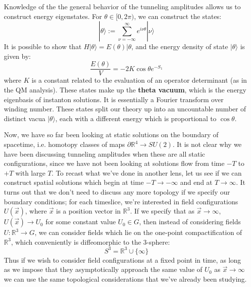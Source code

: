 \documentclass[11pt, oneside]{article}   	%
\theoremstyle{definition}
\begin{document}
Knowledge of the the general behavior of the tunneling amplitudes allows us to construct energy eigenstates. For $\theta\in [0, 2\pi)$, we can construct the 
states:
\begin{equation}
	|\theta\rangle := \sum_{\nu = -\infty}^\infty e^{i\nu\theta} |\nu\rangle
\end{equation}
It is possible to show that $H|\theta\rangle = E(\theta)|\theta$, and the energy density of state $|\theta\rangle$ is given by:
\begin{equation}
	\frac{E(\theta)}{V} = -2K\cos\theta e^{-S_1}
\end{equation}
where $K$ is a constant related to the evaluation of an operator determinant (as in the QM analysis). These states make up the 
\textbf{theta vacuum}, which is the energy eigenbasis of instanton solutions. It is essentially a Fourier transform over winding number. 
These states split our theory up into an uncountable number of distinct vacua $|\theta\rangle$, each with a different energy which is 
proportional to $\cos\theta$. 

Now, we have so far been looking at static solutions on the boundary of spacetime, i.e. homotopy classes of maps $\partial\mathbb R^4
\rightarrow SU(2)$. It is not clear why we have been discussing tunneling amplitudes when these are all static configurations, since we 
have not been looking at solutions flow from time $-T$ to $+T$ with large $T$. To recast what we've done in another lens, let us see if 
we can construct spatial solutions which begin at time $-T\rightarrow-\infty$ and end at $T\rightarrow\infty$. It turns out that we don't 
need to discuss any more topology if we specify our boundary conditions; for each timeslice, we're interested in field configurations 
$U(\vec x)$, where $\vec x$ is a position vector in $\mathbb R^3$. If we specify that as $\vec x\rightarrow\infty$, $U(\vec x)\rightarrow 
U_0$ for some constant value $U_0\in G$, then instead of considering fields $U : \mathbb R^3\rightarrow G$, we can consider 
fields which lie on the one-point compactification of $\mathbb R^3$, which conveniently is diffeomorphic to the 3-sphere:
\begin{equation}
	S^3 = \mathbb R^3\cup\{\infty\}
\end{equation}
Thus if we wish to consider field configurations at a fixed point in time, as long as we impose that they asymptotically approach the 
same value of $U_0$ as $\vec x\rightarrow\infty$ we can use the same topological considerations that we've already been 
studying. 
\end{document}
